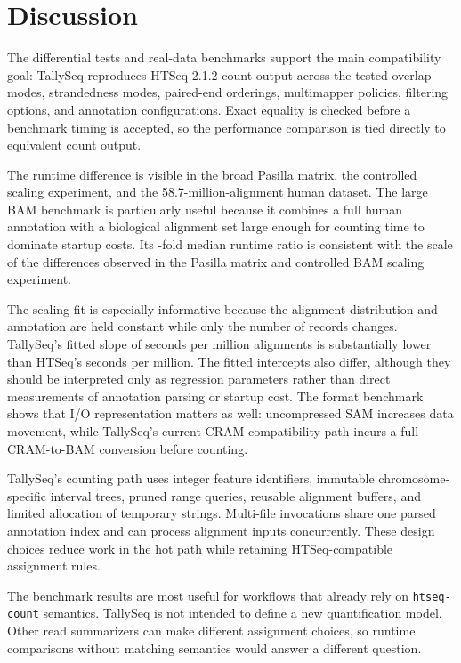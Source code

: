 \documentclass[11pt]{article}
\begin{document}
\section{Discussion}

The differential tests and real-data benchmarks support the main compatibility goal: TallySeq reproduces HTSeq 2.1.2 count output across the tested overlap modes, strandedness modes, paired-end orderings, multimapper policies, filtering options, and annotation configurations. Exact equality is checked before a benchmark timing is accepted, so the performance comparison is tied directly to equivalent count output.

The runtime difference is visible in the broad Pasilla matrix, the controlled scaling experiment, and the 58.7-million-alignment human dataset. The large BAM benchmark is particularly useful because it combines a full human annotation with a biological alignment set large enough for counting time to dominate startup costs. Its \LargeBamSpeedup{}-fold median runtime ratio is consistent with the scale of the differences observed in the Pasilla matrix and controlled BAM scaling experiment.

The scaling fit is especially informative because the alignment distribution and annotation are held constant while only the number of records changes. TallySeq's fitted slope of \ScalingTallySlope{} seconds per million alignments is substantially lower than HTSeq's \ScalingHTSeqSlope{} seconds per million. The fitted intercepts also differ, although they should be interpreted only as regression parameters rather than direct measurements of annotation parsing or startup cost. The format benchmark shows that I/O representation matters as well: uncompressed SAM increases data movement, while TallySeq's current CRAM compatibility path incurs a full CRAM-to-BAM conversion before counting.

TallySeq's counting path uses integer feature identifiers, immutable chromosome-specific interval trees, pruned range queries, reusable alignment buffers, and limited allocation of temporary strings. Multi-file invocations share one parsed annotation index and can process alignment inputs concurrently. These design choices reduce work in the hot path while retaining HTSeq-compatible assignment rules.

The benchmark results are most useful for workflows that already rely on \texttt{htseq-count} semantics. TallySeq is not intended to define a new quantification model. Other read summarizers can make different assignment choices, so runtime comparisons without matching semantics would answer a different question.
\end{document}
